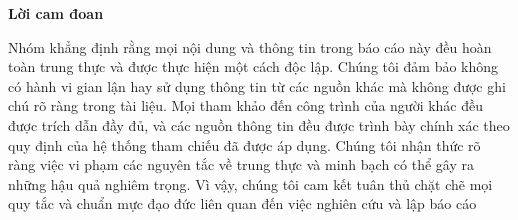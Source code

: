 \begin{center}
   \textbf{\LARGE Lời cam đoan} 
\end{center}
\vspace{2cm}
Nhóm khẳng định rằng mọi nội dung và thông tin trong báo cáo này đều hoàn toàn trung thực và được thực hiện một cách độc lập. Chúng tôi đảm bảo không  có hành vi gian lận hay sử dụng thông tin từ các nguồn khác mà không được ghi chú rõ ràng trong tài liệu. Mọi tham khảo đến công trình của người khác đều được trích dẫn đầy đủ, và các nguồn thông tin đều được trình bày chính xác theo quy định của hệ thống tham chiếu đã được áp dụng.
Chúng tôi nhận thức rõ ràng việc vi phạm các nguyên tắc về trung thực và minh bạch có thể gây ra những hậu quả nghiêm trọng. Vì vậy, chúng tôi cam kết tuân thủ chặt chẽ mọi quy tắc và chuẩn mực đạo đức liên quan đến việc nghiên cứu và lập báo cáo